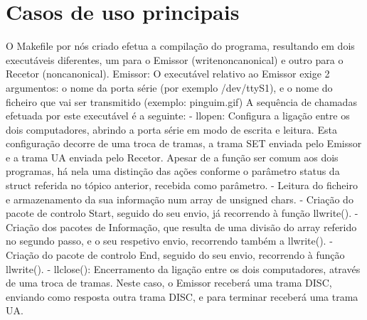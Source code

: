 \documentclass[article, a4paper, 11pt, oneside]{memoir}
\begin{document}
\newpage
\chapter[Casos de uso principais][Casos de uso principais]{Casos de uso principais} \label{\thechapter}

O Makefile por nós criado efetua a compilação do programa, resultando em dois executáveis diferentes, um para o Emissor (writenoncanonical) e outro para o Recetor (noncanonical).
Emissor:
O executável relativo ao Emissor exige 2 argumentos: o nome da porta série (por exemplo /dev/ttyS1), e o nome do ficheiro que vai ser transmitido (exemplo: pinguim.gif)
A sequência de chamadas efetuada por este executável é a seguinte:
 - llopen: Configura a ligação entre os dois computadores, abrindo a porta série em modo de escrita e leitura. Esta configuração decorre de uma troca de tramas, a trama SET enviada pelo Emissor e a trama UA enviada pelo Recetor. Apesar de a função ser comum aos dois programas, há nela uma distinção das ações conforme o parâmetro status da struct referida no tópico anterior, recebida como parâmetro.
 - Leitura do ficheiro e armazenamento da sua informação num array de unsigned chars.
 - Criação do pacote de controlo Start, seguido do seu envio, já recorrendo à função llwrite().
 - Criação dos pacotes de Informação, que resulta de uma divisão do array referido no segundo passo, e o seu respetivo envio, recorrendo também a llwrite().
 - Criação do pacote de controlo End, seguido do seu envio, recorrendo à função llwrite().
 - llclose(): Encerramento da ligação entre os dois computadores, através de uma troca de tramas. Neste caso, o Emissor receberá uma trama DISC, enviando como resposta outra trama DISC, e para terminar receberá uma trama UA.
\end{document}

